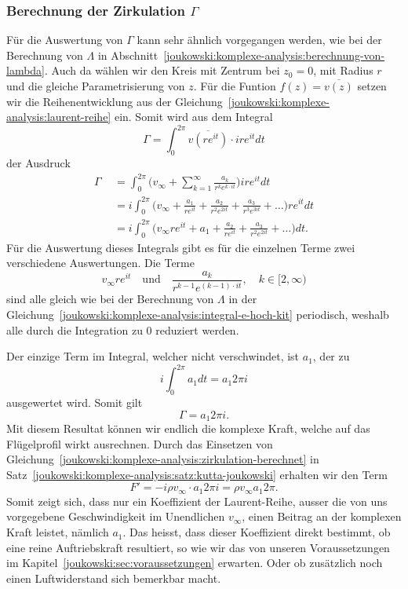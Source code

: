 \subsubsection{Berechnung der Zirkulation $\Gamma$}
Für die Auswertung von $\Gamma$ kann sehr ähnlich vorgegangen werden, wie bei der Berechnung von $\Lambda$ in Abschnitt~\ref{joukowski:komplexe-analysis:berechnung-von-lambda}.
Auch da wählen wir den Kreis mit Zentrum bei $z_0 = 0$, mit Radius $r$ und die gleiche Parametrisierung von $z$.
Für die Funtion $f(z) = \overline{v(z)}$ setzen wir die Reihenentwicklung aus der Gleichung~\eqref{joukowski:komplexe-analysis:laurent-reihe} ein.
Somit wird aus dem Integral
\[
	\Gamma
	=
	\displaystyle\int_{0}^{2\pi}
	\overline{v(r e^{i t})} \cdot i r e^{i t}
	dt
\]
der Ausdruck
\[
	\begin{aligned}
		\Gamma
		&=
		\displaystyle\int_{0}^{2\pi}
		\biggl(v_\infty + \sum_{k=1}^{\infty} \frac{a_k}{r^k e^{k \cdot i t}}\biggr)
		i r e^{i t}
		dt \\
		\quad
		&=
		i\displaystyle\int_{0}^{2\pi}
		\biggl(v_\infty + \frac{a_1}{r e^{i t}} + \frac{a_2}{r^2 e^{2 i t}} + \frac{a_3}{r^3 e^{3 i t}} + \dots \biggr)
		r e^{i t}
		dt \\
		\quad
		&=
		i\displaystyle\int_{0}^{2\pi}
		\biggl(v_\infty r e^{i t} + a_1 + \frac{a_2}{r e^{i t}} + \frac{a_3}{r^2 e^{2 i t}} + \dots \biggr)
		dt.
	\end{aligned}
\]
Für die Auswertung dieses Integrals gibt es für die einzelnen Terme zwei verschiedene Auswertungen.
Die Terme
\[
	v_\infty r e^{i t}
	\quad
	\text{und}
	\quad
	\frac{a_k}{r^{k-1} e^{(k-1) \cdot i t}},
	\quad
	k \in [2, \infty)
\]
sind alle gleich wie bei der Berechnung von $\Lambda$ in der Gleichung~\eqref{joukowski:komplexe-analysis:integral-e-hoch-kit} periodisch,
weshalb alle durch die Integration zu $0$ reduziert werden.

Der einzige Term im Integral, welcher nicht verschwindet, ist $a_1$, der zu
\[
	i\displaystyle\int_{0}^{2\pi}
	a_1
	dt
	=
	a_1 2\pi i
\]
ausgewertet wird.
Somit gilt
\begin{equation}
	\Gamma
	=
	a_1 2\pi i.
	\label{joukowski:komplexe-analysis:zirkulation-berechnet}
\end{equation}
Mit diesem Resultat können wir endlich die komplexe Kraft, welche auf das Flügelprofil wirkt ausrechnen.
Durch das Einsetzen von Gleichung~\eqref{joukowski:komplexe-analysis:zirkulation-berechnet}
in Satz~\ref{joukowski:komplexe-analysis:satz:kutta-joukowski}
erhalten wir den Term
\begin{equation}
	F'
	=
	-i \rho v_\infty \cdot a_1 2\pi i
	= \rho v_\infty a_1 2 \pi.
	\label{joukowski:komplexe-analysis:auftriebskraft-berechnet}
\end{equation}
Somit zeigt sich, dass nur ein Koeffizient der Laurent-Reihe, 
ausser die von uns vorgegebene Geschwindigkeit im Unendlichen $v_\infty$, 
einen Beitrag an der komplexen Kraft leistet, nämlich $a_1$.
Das heisst, dass dieser Koeffizient direkt bestimmt, 
ob eine reine Auftriebskraft resultiert, so wie wir das von unseren Voraussetzungen im Kapitel~\ref{joukowski:sec:voraussetzungen} erwarten.
Oder ob zusätzlich noch einen Luftwiderstand sich bemerkbar macht.

